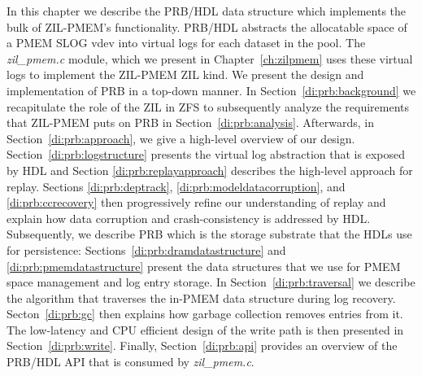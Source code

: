 \documentclass[12pt,a4paper,twoside]{book}
\begin{document}
In this chapter we describe the PRB/HDL data structure which implements the bulk of ZIL-PMEM's functionality.
PRB/HDL abstracts the allocatable space of a PMEM SLOG vdev into virtual logs for each dataset in the pool.
The \textit{zil\_pmem.c} module, which we present in Chapter~\ref{ch:zilpmem} uses these virtual logs to implement the ZIL-PMEM ZIL kind.
We present the design and implementation of PRB in a top-down manner.
In Section~\ref{di:prb:background} we recapitulate the role of the ZIL in ZFS to subsequently analyze the requirements that ZIL-PMEM puts on PRB in Section~\ref{di:prb:analysis}.
Afterwards, in Section~\ref{di:prb:approach}, we give a high-level overview of our design.
Section~\ref{di:prb:logstructure} presents the virtual log abstraction that is exposed by HDL and Section \ref{di:prb:replayapproach} describes the high-level approach for replay.
Sections \ref{di:prb:deptrack}, \ref{di:prb:modeldatacorruption}, and \ref{di:prb:ccrecovery} then progressively refine our understanding of replay and explain how data corruption and crash-consistency is addressed by HDL.
Subsequently, we describe PRB which is the storage substrate that the HDLs use for persistence:
Sections~\ref{di:prb:dramdatastructure} and \ref{di:prb:pmemdatastructure} present the data structures that we use for PMEM space management and log entry storage.
In Section~\ref{di:prb:traversal} we describe the algorithm that traverses the in-PMEM data structure during log recovery.
Secton~\ref{di:prb:gc} then explains how garbage collection removes entries from it.
The low-latency and CPU efficient design of the write path is then presented in Section~\ref{di:prb:write}.
Finally, Section~\ref{di:prb:api} provides an overview of the PRB/HDL API that is consumed by \textit{zil\_pmem.c}.
\end{document}

